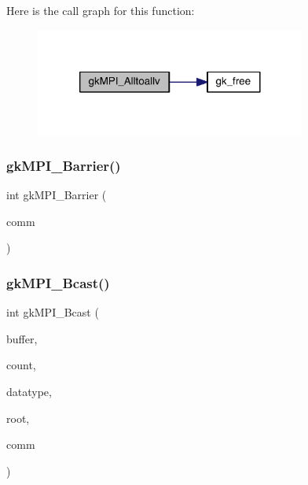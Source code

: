 Here is the call graph for this function\+:\nopagebreak
\begin{figure}[H]
\begin{center}
\leavevmode
\includegraphics[width=252pt]{a00359_ae0651b090fd2a6a021996fc1998a429c_cgraph}
\end{center}
\end{figure}
\mbox{\label{a00359_a1edf33502a17ee84cb573dc0bd989bda}} 
\subsubsection{\texorpdfstring{gk\+M\+P\+I\+\_\+\+Barrier()}{gkMPI\_Barrier()}}
{\footnotesize\ttfamily int gk\+M\+P\+I\+\_\+\+Barrier (\begin{DoxyParamCaption}\item[{M\+P\+I\+\_\+\+Comm}]{comm }\end{DoxyParamCaption})}

\mbox{\label{a00359_a22d90d341b85ea6b900bae0a5f9a8b71}} 
\subsubsection{\texorpdfstring{gk\+M\+P\+I\+\_\+\+Bcast()}{gkMPI\_Bcast()}}
{\footnotesize\ttfamily int gk\+M\+P\+I\+\_\+\+Bcast (\begin{DoxyParamCaption}\item[{void $\ast$}]{buffer,  }\item[{\hyperlink{a00876_aaa5262be3e700770163401acb0150f52}{idx\+\_\+t}}]{count,  }\item[{M\+P\+I\+\_\+\+Datatype}]{datatype,  }\item[{\hyperlink{a00876_aaa5262be3e700770163401acb0150f52}{idx\+\_\+t}}]{root,  }\item[{M\+P\+I\+\_\+\+Comm}]{comm }\end{DoxyParamCaption})}

